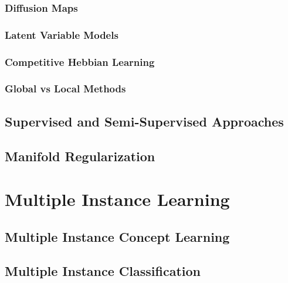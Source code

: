 	\subsubsection{Diffusion Maps}
	
	\subsubsection{Latent Variable Models}
	
	\subsubsection{Competitive Hebbian Learning}

	\subsubsection{Global vs Local Methods}

%

\subsection{Supervised and Semi-Supervised Approaches}

\subsection{Manifold Regularization}


\section{Multiple Instance Learning}

\subsection{Multiple Instance Concept Learning}

\subsection{Multiple Instance Classification}


